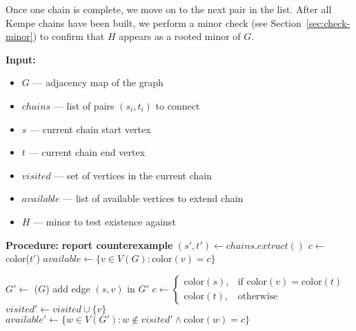 Once one chain is complete, we move on to the next pair in the list. After all Kempe chains have been built, we perform a minor check (see Section~\ref{sec:check-minor}) to confirm that $H$ appears as a rooted minor of $G$.

\begin{algorithm}[H]
    \caption{$(G, \mathit{chains}, s, t, \mathit{visited}, \mathit{available}, H)$}
    \begin{algorithmic}[1]
        \Statex \textbf{Input:}
        \begin{itemize}
            \item $G$ — adjacency map of the graph
            \item $\mathit{chains}$ — list of pairs $(s_i,t_i)$ to connect
            \item $s$ — current chain start vertex
            \item $t$ — current chain end vertex
            \item $\mathit{visited}$ — set of vertices in the current chain
            \item $\mathit{available}$ — list of available vertices to extend chain
            \item $H$ — minor to test existence against
        \end{itemize}
        \Statex \textbf{Procedure:}
                    \Return
                \Else
                    \State \textbf{report counterexample}
                \EndIf
            \Else {}
                \State $(s',t') \gets \mathit{chains.extract()}$
                \State $c \gets$ color($t'$)
                \State $\mathit{available} \gets \{v \in V(G): \text{color}(v)=c\}$
                \State {}
            \EndIf
            \State \Return
        \EndIf

            \State $G' \gets$ ($G$)
            \State add edge $(s,v)$ in $G'$ 
            \State $c \gets \begin{cases}
 \text{color}(s), & \text{if } \text{color}(v) = \text{color}(t) \\
 \text{color}(t), & \text{otherwise}
            \end{cases}$
            \State $\mathit{visited}' \gets \mathit{visited} \cup \{v\}$
            \State $\mathit{available}' \gets \{ w \in V(G'): w \notin \mathit{visited}' \wedge \text{color}(w)=c\}$
            \State {}
        \EndFor
    \end{algorithmic}
\end{algorithm}

